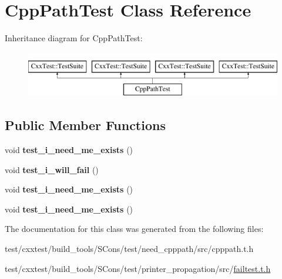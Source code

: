 \hypertarget{classCppPathTest}{\section{Cpp\-Path\-Test Class Reference}
\label{classCppPathTest}
}
Inheritance diagram for Cpp\-Path\-Test\-:\begin{figure}[H]
\begin{center}
\leavevmode
\includegraphics[height=2.000000cm]{classCppPathTest}
\end{center}
\end{figure}
\subsection*{Public Member Functions}
\begin{DoxyCompactItemize}
\item 
\hypertarget{classCppPathTest_adab4e4917cc831523ec6428ce5e4a695}{void {\bfseries test\-\_\-i\-\_\-need\-\_\-me\-\_\-exists} ()}\label{classCppPathTest_adab4e4917cc831523ec6428ce5e4a695}

\item 
\hypertarget{classCppPathTest_ac9514a3d354e7888621b93326b8ac58c}{void {\bfseries test\-\_\-i\-\_\-will\-\_\-fail} ()}\label{classCppPathTest_ac9514a3d354e7888621b93326b8ac58c}

\item 
\hypertarget{classCppPathTest_adab4e4917cc831523ec6428ce5e4a695}{void {\bfseries test\-\_\-i\-\_\-need\-\_\-me\-\_\-exists} ()}\label{classCppPathTest_adab4e4917cc831523ec6428ce5e4a695}

\item 
\hypertarget{classCppPathTest_adab4e4917cc831523ec6428ce5e4a695}{void {\bfseries test\-\_\-i\-\_\-need\-\_\-me\-\_\-exists} ()}\label{classCppPathTest_adab4e4917cc831523ec6428ce5e4a695}

\end{DoxyCompactItemize}


The documentation for this class was generated from the following files\-:\begin{DoxyCompactItemize}
\item 
test/cxxtest/build\-\_\-tools/\-S\-Cons/test/need\-\_\-cpppath/src/cpppath.\-t.\-h\item 
test/cxxtest/build\-\_\-tools/\-S\-Cons/test/printer\-\_\-propagation/src/\hyperlink{failtest_8t_8h}{failtest.\-t.\-h}\end{DoxyCompactItemize}
